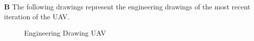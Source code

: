 \documentclass[12pt]{article}
\begin{document}
\noindent \textbf{B} The following drawings represent the engineering drawings of the most recent iteration of the UAV. \\ 

\newpage 

\begin{figure}

\caption{Engineering Drawing UAV}
\end{figure}
\end{document}
